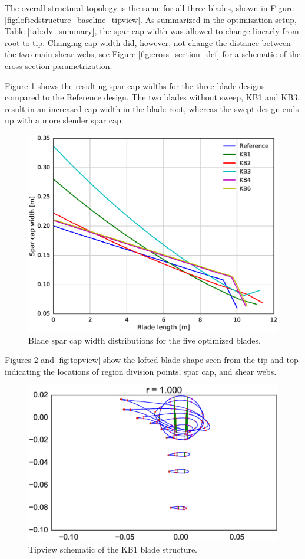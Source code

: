 The overall structural topology is the same for all three blades, shown in Figure \ref{fig:loftedstructure_baseline_tipview}.
As summarized in the optimization setup, Table \ref{tab:dv_summary}, the spar cap width was allowed to change linearly from root to tip.
Changing cap width did, however, not change the distance between the two main shear webs, see Figure \ref{fig:cross_section_def} for a schematic of the cross-section parametrization.

Figure \ref{fig:capwidth} shows the resulting spar cap widths for the three blade designs compared to the Reference design.
The two blades without sweep, KB1 and KB3, result in an increased cap width in the blade root, whereas the swept design ends up with a more slender spar cap.  

\begin{figure}[!ht]
\begin{center}
	\includegraphics[width=.85\linewidth]{figures/KBcomp_spar_cap_width.eps}
\end{center}
\caption{Blade spar cap width distributions for the five optimized blades.}
\label{fig:capwidth}
\end{figure}

Figures \ref{fig:tipview} and \ref{fig:topview} show the lofted blade shape seen from the tip and top indicating the locations of region division points, spar cap, and shear webs.

\begin{figure}[!ht]
\begin{center}
	\includegraphics[width=.85\linewidth]{figures/KB1_tipview.eps}
\end{center}
\caption{Tipview schematic of the KB1 blade structure.}
\label{fig:tipview}
\end{figure}

